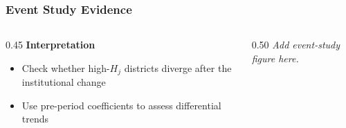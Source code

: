 \begin{frame}
    \frametitle{Event Study Evidence}

    \begin{columns}[T]
    \begin{column}{0.45\textwidth}
        \textbf{Interpretation}
        \begin{itemize}
            \item Check whether high-\(H_j\) districts diverge after the institutional change
            \item Use pre-period coefficients to assess differential trends
        \end{itemize}
    \end{column}
    \begin{column}{0.50\textwidth}
        \centering
        \vspace{1.5em}
        \textit{Add event-study figure here.}
    \end{column}
    \end{columns}
\end{frame}
